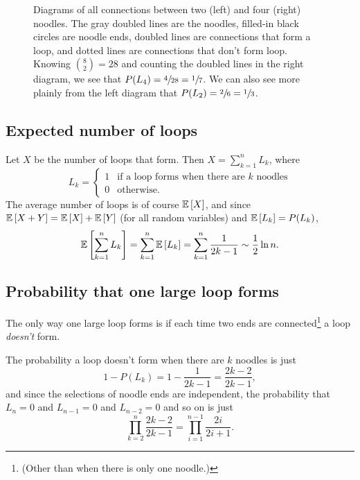 \documentclass{book}
\begin{document}
\begin{figure}[h]
  \centering
{}
\caption{Diagrams of all connections between two (left) and four (right) noodles. The gray doubled lines are the noodles, filled-in black circles
  are noodle ends, doubled lines are connections that form a loop, and dotted lines are connections that don't form loop. Knowing $\binom{8}{2} = 28$ and counting the doubled lines in the right diagram, we see that $P(L_4)=\sfrac{4}{28}=\sfrac{1}{7}$. We can also see more plainly from the left diagram that $P(L_2)=\sfrac{2}{6}=\sfrac{1}{3}$.
}
\label{fig1}
\end{figure}

\subsection*{Expected number of loops}
Let $X$ be the number of loops that form. Then $X = \sum_{k=1}^{n} L_k$, where
\begin{equation*}
L_k = \begin{cases}
  1 &\text{if a loop forms when there are $k$ noodles}\\
  0 &\text{otherwise}.
  \end{cases}
\end{equation*}
The average number of loops is of course $\mathbb{E}\left[X\right]$, and since $\mathbb{E}\left[X + Y\right] = \mathbb{E}\left[X\right]+\mathbb{E}\left[Y\right]$ (for all random variables) and
$\mathbb{E}\left[L_k\right] = P(L_k)$,
\[
\mathbb{E}\left[\sum_{k=1}^n L_k\right] = \sum_{k=1}^n \mathbb{E}\left[L_k\right] = \sum_{k=1}^n \frac{1}{2k-1} \sim \frac{1}{2}\ln n.
\]

\subsection*{Probability that one large loop forms}
The only way one large loop forms is if each time two
ends are connected\footnote{(Other than when there is only one noodle.)} a loop \textit{doesn't} form.

The probability a loop doesn't form when there are $k$ noodles is just
\[
1-P(L_k)=1-\frac{1}{2k-1}=\frac{2k-2}{2k-1},
\]
and since the selections
of noodle ends are independent, the probability that $L_n = 0$ and $L_{n-1} = 0$ and $L_{n-2} = 0$ and so on is just
\[
\prod_{k=2}^{n}\frac{2k-2}{2k-1} = \prod_{i=1}^{n-1}\frac{2i}{2i+1}.
\]
\end{document}
